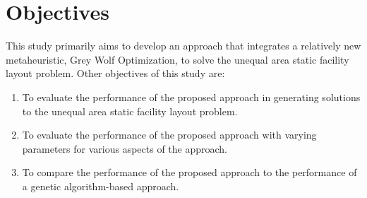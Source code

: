 \chapter{Objectives}
This study primarily aims to develop an approach that integrates a relatively new metaheuristic, Grey Wolf Optimization, to solve the unequal area static facility layout problem. Other objectives of this study are:

\begin{enumerate}
	\item To evaluate the performance of the proposed approach in generating solutions to the unequal area static facility layout problem.
	
	\item To evaluate the performance of the proposed approach with varying parameters for various aspects of the approach.
	
	\item To compare the performance of the proposed approach to the performance of a genetic algorithm-based approach.
\end{enumerate}